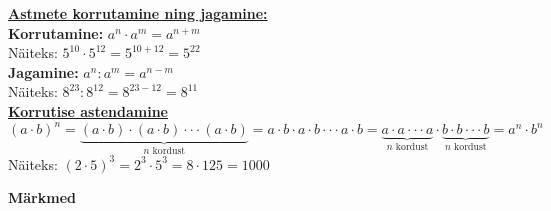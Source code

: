 \begin{center}
{{{\begin{flushleft}
\vspace{5mm}
\hspace{5mm} \textbf{\underline{Astmete korrutamine ning jagamine:}}\\
\vspace{5mm}
\hspace{5mm} \textbf{Korrutamine:} $a^{n} \cdot a^{m} = a^{n+m}$\\
\vspace{2mm}
\hspace{5mm} Näiteks: $5^{10} \cdot 5^{12} = 5^{10+12}=5^{22}$\\
\vspace{5mm}
\hspace{5mm} \textbf{Jagamine:} $a^{n} : a^{m} = a^{n-m}$\\
\vspace{2mm}
\hspace{5mm} Näiteks: $8^{23} : 8^{12}= 8^{23-12}=8^{11}$\\
\vspace{5mm}
\hspace{5mm} \textbf{\underline{Korrutise astendamine}}\\
\vspace{5mm}
\hspace{5mm} $(a \cdot b)^{n}= \underbrace{(a \cdot b) \cdot (a \cdot b) \cdot \cdot \cdot (a \cdot b)}_\text{$n$ kordust}=a \cdot b \cdot a \cdot b \cdot \cdot \cdot a \cdot b= \underbrace{a\cdot a \cdot \cdot \cdot a}_\text{$n$ kordust} \cdot \underbrace{b \cdot b \cdot \cdot \cdot b}_\text{$n$ kordust}=a^{n}\cdot b^{n}$\\
\vspace{2mm}
\hspace{5mm} Näiteks: $(2\cdot 5)^{3}=2^{3}\cdot 5^{3}=8 \cdot 125 = 1000$\\
\vspace{5mm}

\end{flushleft} }}}
\end{center}

\newpage

\begin{center}
\end{center}

\textbf{Märkmed}\\
\vspace{2mm}
\begin{mdframed}[style=graphpaper]
\vspace{14cm}
\end{mdframed}